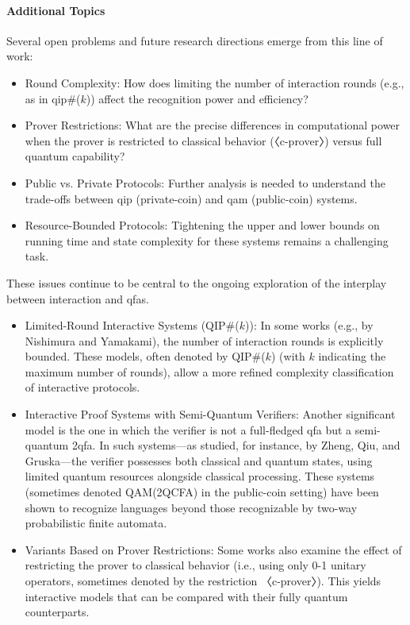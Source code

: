 \paragraph{Additional Topics}
Several open problems and future research directions emerge from this line of work:
\begin{itemize}
  \item Round Complexity: How does limiting the number of interaction rounds (e.g., as in \gls{qip}\#($k$)) affect the recognition power and efficiency?
  \item Prover Restrictions: What are the precise differences in computational power when the prover is restricted to classical behavior (〈c-prover〉) versus full quantum capability?
  \item Public vs. Private Protocols: Further analysis is needed to understand the trade-offs between \gls{qip} (private-coin) and \gls{qam} (public-coin) systems.
  \item Resource-Bounded Protocols: Tightening the upper and lower bounds on running time and state complexity for these systems remains a challenging task.
\end{itemize}
These issues continue to be central to the ongoing exploration of the interplay between interaction and \glspl{qfa}.

\begin{itemize}
  \item Limited-Round Interactive Systems (QIP\#($k$)): In some works (e.g., by Nishimura and Yamakami), the number of interaction rounds is explicitly bounded. These models, often denoted by QIP\#($k$) (with $k$ indicating the maximum number of rounds), allow a more refined complexity classification of interactive protocols.
  
  \item Interactive Proof Systems with Semi-Quantum Verifiers: Another significant model is the one in which the verifier is not a full-fledged \gls{qfa} but a semi-quantum \gls{2qfa}. In such systems—as studied, for instance, by Zheng, Qiu, and Gruska—the verifier possesses both classical and quantum states, using limited quantum resources alongside classical processing. These systems (sometimes denoted QAM(2QCFA) in the public-coin setting) have been shown to recognize languages beyond those recognizable by two-way probabilistic finite automata.
  
  \item Variants Based on Prover Restrictions: Some works also examine the effect of restricting the prover to classical behavior (i.e., using only 0-1 unitary operators, sometimes denoted by the restriction 〈c-prover〉). This yields interactive models that can be compared with their fully quantum counterparts.
\end{itemize}

